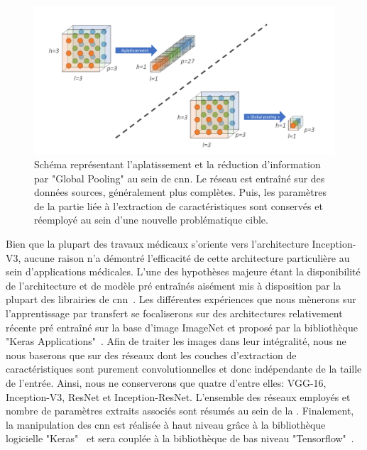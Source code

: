 \begin{figure}[H]
    \centering
    \includegraphics[width=\linewidth]{contents/chapter_4/resources/scheme_global_pooling.pdf}
    \caption{Schéma représentant l'aplatissement et la réduction d'information par "Global Pooling" au sein de \gls{cnn}. Le réseau est entraîné sur des données sources, généralement plus complètes. Puis, les paramètres de la partie liée à l'extraction de caractéristiques sont conservés et réemployé au sein d'une nouvelle problématique cible.}
    \label{fig:scheme_global_pooling}
\end{figure}\par

Bien que la plupart des travaux médicaux s'oriente vers l'architecture Inception-V3, aucune raison n'a démontré l'efficacité de cette architecture particulière au sein d'applications médicales. L'une des hypothèses majeure étant la disponibilité de l'architecture et de modèle pré entraînés aisément mis à disposition par la plupart des librairies de \gls{cnn}~\cite{Litjens2017}. Les différentes expériences que nous mènerons sur l'apprentissage par transfert se focaliserons sur des architectures relativement récente pré entraîné sur la base d'image ImageNet et proposé par la bibliothèque "Keras Applications"~\cite{chollet2015a}. Afin de traiter les images dans leur intégralité, nous ne nous baserons que sur des réseaux dont les couches d'extraction de caractéristiques sont purement convolutionnelles et donc indépendante de la taille de l'entrée. Ainsi, nous ne conserverons que quatre d'entre elles: VGG-16, Inception-V3, ResNet et Inception-ResNet. L'ensemble des réseaux employés et nombre de paramètres extraits associés sont résumés au sein de la . Finalement, la manipulation des \ac{cnn} est réalisée à haut niveau grâce à la bibliothèque logicielle "Keras"~\cite{chollet2015} et sera couplée à la bibliothèque de bas niveau "Tensorflow"~\cite{tensorflow2015}.\par

